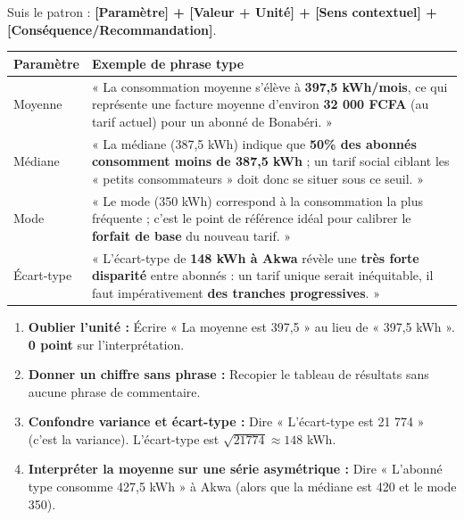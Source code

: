 \documentclass[11pt]{article}
\begin{document}
\begin{methode}
Suis le patron : \textbf{[Paramètre] + [Valeur + Unité] + [Sens contextuel] + [Conséquence/Recommandation]}.

\begin{tabularx}{\linewidth}{|l|X|}\hline
\textbf{Paramètre} & \textbf{Exemple de phrase type} \\ \hline
Moyenne & « La consommation moyenne s'élève à \textbf{397,5 kWh/mois}, ce qui représente une facture moyenne d'environ \textbf{32 000 FCFA} (au tarif actuel) pour un abonné de Bonabéri. » \\ \hline
Médiane & « La médiane (387,5 kWh) indique que \textbf{50\% des abonnés consomment moins de 387,5 kWh} ; un tarif social ciblant les « petits consommateurs » doit donc se situer sous ce seuil. » \\ \hline
Mode & « Le mode (350 kWh) correspond à la consommation la plus fréquente ; c'est le point de référence idéal pour calibrer le \textbf{forfait de base} du nouveau tarif. » \\ \hline
Écart-type & « L'écart-type de \textbf{148 kWh à Akwa} révèle une \textbf{très forte disparité} entre abonnés : un tarif unique serait inéquitable, il faut impérativement \textbf{des tranches progressives}. » \\ \hline
\end{tabularx}
\end{methode}

\begin{attention}
\begin{enumerate}
    \item \textbf{Oublier l'unité :} Écrire « La moyenne est 397,5 » au lieu de « 397,5 kWh ». \textbf{0 point} sur l'interprétation.
    \item \textbf{Donner un chiffre sans phrase :} Recopier le tableau de résultats sans aucune phrase de commentaire.
    \item \textbf{Confondre variance et écart-type :} Dire « L'écart-type est 21 774 » (c'est la variance). L'écart-type est $\sqrt{21774} \approx 148$ kWh.
    \item \textbf{Interpréter la moyenne sur une série asymétrique :} Dire « L'abonné type consomme 427,5 kWh » à Akwa (alors que la médiane est 420 et le mode 350).
\end{enumerate}
\end{attention}
\end{document}
